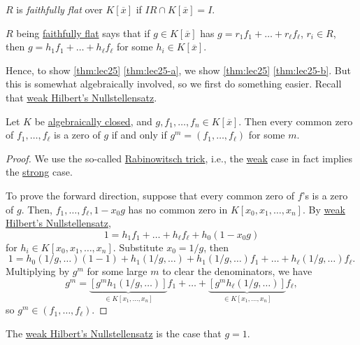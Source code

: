 \begin{notation}\label{not:faithfully-flat}
	\(R\) is \emph{faithfully flat} over \(K[\overline{x} ]\) if \(IR \cap K[\overline{x} ] = I\).
\end{notation}

\begin{intuition}
	\(R\) being \hyperref[not:faithfully-flat]{faithfully flat} says that if \(g\in K[\overline{x} ]\) has \(g = r_1 f_1 + \dots + r_{\ell } f_{\ell } \), \(r_i\in R\), then \(g = h_1 f_1 + \dots + h_{\ell } f_{\ell }  \) for some \(h_i \in K[\overline{x} ]\).
\end{intuition}

Hence, to show \autoref{thm:lec25} \autoref{thm:lec25-a}, we show \autoref{thm:lec25} \autoref{thm:lec25-b}. But this is somewhat algebraically involved, so we first do something easier. Recall that \hyperref[thm:weak-Hilbert-Nullstellensatz]{weak Hilbert's Nullstellensatz}.

\begin{theorem}[Nullstellensatz]\label{thm:Hilbert-Nullstellensatz}
	Let \(K\) be \hyperref[def:algebraically-closed]{algebraically closed}, and \(g, f_1, \dots , f_n\in K[\overline{x} ]\). Then every common zero of \(f_1, \dots , f_{\ell } \) is a zero of \(g\) if and only if \(g^m = (f_1, \dots , f_{\ell } )\) for some \(m\).
\end{theorem}
\begin{proof}
	We use the so-called \href{https://en.wikipedia.org/wiki/Rabinowitsch_trick}{Rabinowitsch trick}, i.e., the \hyperref[thm:weak-Hilbert-Nullstellensatz]{weak} case in fact implies the \hyperref[thm:Hilbert-Nullstellensatz]{strong} case.

	To prove the forward direction, suppose that every common zero of \(f\)'s is a zero of \(g\). Then, \(f_1, \dots , f_{\ell }, 1 - x_0 g \) has no common zero in \(K[x_0, x_1, \dots , x_n]\). By \hyperref[thm:weak-Hilbert-Nullstellensatz]{weak Hilbert's Nullstellensatz},
	\[
		1 = h_1 f_1 + \dots + h_{\ell } f_{\ell } + h_0 (1 - x_0 g)
	\]
	for \(h_i \in K[x_0, x_1, \dots , x_n]\). Substitute \(x_0 = 1 / g\), then
	\[
		1 = h_0(1 / g, \dots ) (1 - 1) + h_1 ( 1/g, \dots ) + h_1(1 / g, \dots )f_1 + \dots + h_{\ell } (1 / g, \dots ) f_{\ell }.
	\]
	Multiplying by \(g^m\) for some large \(m\) to clear the denominators, we have
	\[
		g^m = \underbrace{[g^m h_1(1 / g, \dots )]}_{\in K[x_1, \dots , x_n]} f_1 + \dots + \underbrace{[g^m h_{\ell } (1 / g, \dots )]}_{\in K[x_1, \dots , x_n]}f_{\ell },
	\]
	so \(g^m\in (f_1, \dots ,f_{\ell } )\).
\end{proof}

\begin{note}
	The \hyperref[thm:weak-Hilbert-Nullstellensatz]{weak Hilbert's Nullstellensatz} is the case that \(g = 1\).
\end{note}